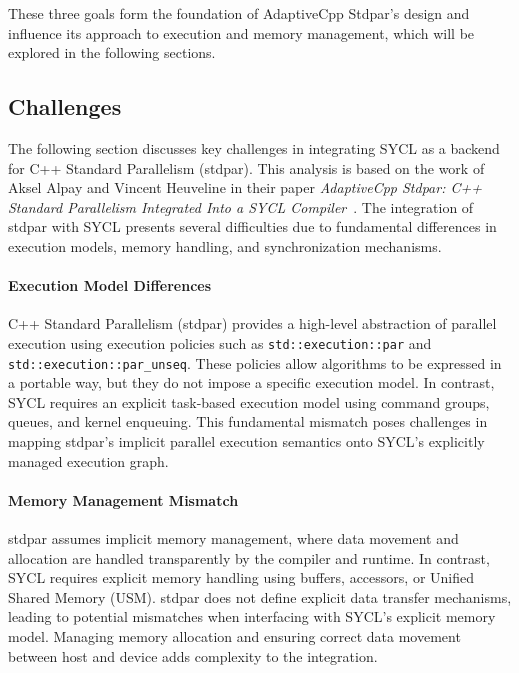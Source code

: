 \noindent These three goals form the foundation of AdaptiveCpp Stdpar’s design and influence its approach
to execution and memory management, which will be explored in the following sections.






\subsection{Challenges}
\label{sec:challenges}

The following section discusses key challenges in integrating SYCL as a backend for C++ Standard Parallelism
(stdpar). This analysis is based on the work of Aksel Alpay and Vincent Heuveline in their paper \textit{AdaptiveCpp
Stdpar: C++ Standard Parallelism Integrated Into a SYCL Compiler}~\cite{alpay2021}. The integration of stdpar with
SYCL presents several difficulties due to fundamental differences in execution models, memory handling, and
synchronization mechanisms. 

\paragraph{Execution Model Differences} 
C++ Standard Parallelism (stdpar) provides a high-level abstraction of parallel execution using execution policies
such as \texttt{std::execution::par} and \texttt{std::execution::par\_unseq}. These policies allow algorithms to be
expressed in a portable way, but they do not impose a specific execution model. In contrast, SYCL requires an
explicit task-based execution model using command groups, queues, and kernel enqueuing. This fundamental
mismatch poses challenges in mapping stdpar's implicit parallel execution semantics onto SYCL's explicitly managed
execution graph.

\paragraph{Memory Management Mismatch} 
stdpar assumes implicit memory management, where data movement and allocation are handled transparently by
the compiler and runtime. In contrast, SYCL requires explicit memory handling using buffers, accessors, or Unified
Shared Memory (USM). stdpar does not define explicit data transfer mechanisms, leading to potential mismatches
when interfacing with SYCL’s explicit memory model. Managing memory allocation and ensuring correct data
movement between host and device adds complexity to the integration.

